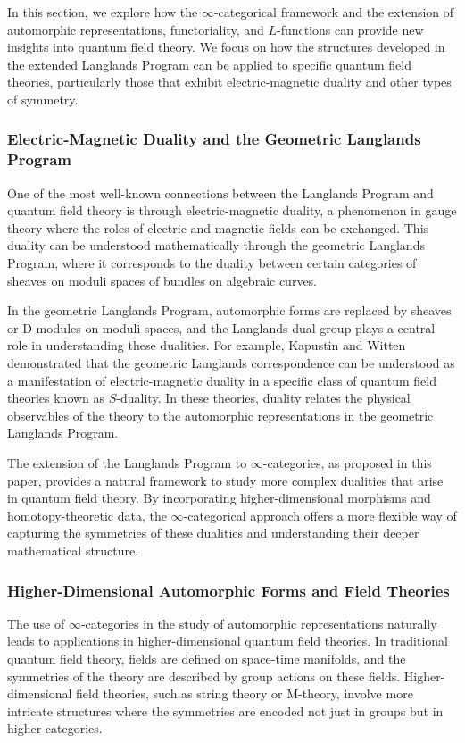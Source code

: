 \documentclass{article}
\theoremstyle{remark}
\begin{document}
In this section, we explore how the $\infty$-categorical framework and the extension of automorphic representations, functoriality, and $L$-functions can provide new insights into quantum field theory. We focus on how the structures developed in the extended Langlands Program can be applied to specific quantum field theories, particularly those that exhibit electric-magnetic duality and other types of symmetry.

\subsubsection{Electric-Magnetic Duality and the Geometric Langlands Program}

One of the most well-known connections between the Langlands Program and quantum field theory is through electric-magnetic duality, a phenomenon in gauge theory where the roles of electric and magnetic fields can be exchanged. This duality can be understood mathematically through the geometric Langlands Program, where it corresponds to the duality between certain categories of sheaves on moduli spaces of bundles on algebraic curves.

In the geometric Langlands Program, automorphic forms are replaced by sheaves or D-modules on moduli spaces, and the Langlands dual group plays a central role in understanding these dualities. For example, Kapustin and Witten \cite{kapustin2006electric} demonstrated that the geometric Langlands correspondence can be understood as a manifestation of electric-magnetic duality in a specific class of quantum field theories known as $S$-duality. In these theories, duality relates the physical observables of the theory to the automorphic representations in the geometric Langlands Program.

The extension of the Langlands Program to $\infty$-categories, as proposed in this paper, provides a natural framework to study more complex dualities that arise in quantum field theory. By incorporating higher-dimensional morphisms and homotopy-theoretic data, the $\infty$-categorical approach offers a more flexible way of capturing the symmetries of these dualities and understanding their deeper mathematical structure.

\subsubsection{Higher-Dimensional Automorphic Forms and Field Theories}

The use of $\infty$-categories in the study of automorphic representations naturally leads to applications in higher-dimensional quantum field theories. In traditional quantum field theory, fields are defined on space-time manifolds, and the symmetries of the theory are described by group actions on these fields. Higher-dimensional field theories, such as string theory or M-theory, involve more intricate structures where the symmetries are encoded not just in groups but in higher categories.
\end{document}
